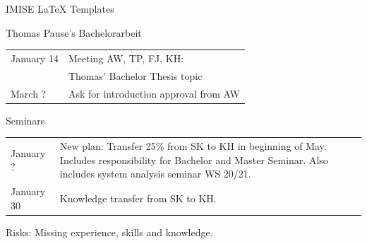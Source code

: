 \documentclass[]{kiesgrube}
\begin{document}
\begin{poster}
\begin{posterbox}[name=risks,column=1,row=0]{IMISE LaTeX Templates}
\end{posterbox}
\begin{posterbox}[name=thomasba,column=0,below=person]{Thomas Pause's Bachelorarbeit}
\begin{tabulary}{\textwidth}{lL}
January 14		&Meeting AW, TP, FJ, KH:\\
			&Thomas' Bachelor Thesis topic\\
March ?			&Ask for introduction approval from AW\\
\end{tabulary}
\end{posterbox}
\begin{posterbox}[name=scienceseminar,column=0,below=thomasba]{Seminars}
\begin{tabulary}{\textwidth}{lL}
January ? 			&New plan: Transfer 25\% from SK to KH in beginning of May. Includes responsibility for Bachelor and Master Seminar. Also includes system analysis seminar WS 20/21.\\
January 30			&Knowledge transfer from SK to KH.\\
\end{tabulary}
Risks: Missing experience, skills and knowledge.
\end{posterbox}




\end{poster}
\end{document}

